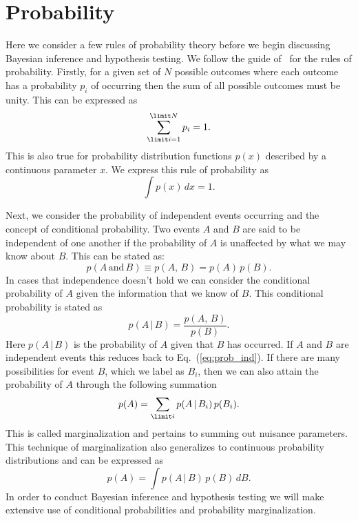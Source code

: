 \section{Probability}\label{sec:probability_basics}
Here we consider a few rules of probability theory before we begin discussing Bayesian inference and hypothesis testing. We follow the guide of~\cite{wall2012practical} for the rules of probability. Firstly, for a given set of $N$ possible outcomes where each outcome has a probability $p_i$ of occurring then the sum of all possible outcomes must be unity. This can be expressed as
\begin{equation}
 \sum_{\limit i=1}^{\limit N} p_i = 1.
\end{equation}
This is also true for probability distribution functions $p(x)$ described by a continuous parameter $x$. We express this rule of probability as
\begin{equation}
 \int p(x) \, dx = 1.
\end{equation}

Next, we consider the probability of independent events occurring and the concept of conditional probability. Two events $A$ and $B$ are said to be independent of one another if the probability of $A$ is unaffected by what we may know about $B$. This can be stated as:
\begin{equation}\label{eq:prob_ind}
 p(A \, \mathrm{and} \, B) \equiv p(A, \, B) = p(A) \, p(B).
\end{equation}
In cases that independence doesn't hold we can consider the conditional probability of $A$ given the information that we know of $B$. This conditional probability is stated as
\begin{equation}
   p(A \, | \, B) = \frac{p(A, \, B)}{p(B)}.
\end{equation}
Here $p(A \, | \, B)$ is the probability of $A$ given that $B$ has occurred. If $A$ and $B$ are independent events this reduces back to Eq.~(\ref{eq:prob_ind}). If there are many possibilities for event $B$, which we label as $B_i$, then we can also attain the probability of $A$ through the following summation
\begin{equation}\label{eq:prob_marginalization}
   p(A) = \sum_{\limit i} p(A \, | \, B_i) \, p(B_i).
\end{equation}
This is called marginalization and pertains to summing out nuisance parameters. This technique of marginalization also generalizes to continuous probability distributions and can be expressed as
\begin{equation}
   p(A) = \int p(A \, | \, B) \, p(B) \, dB.
\end{equation}
In order to conduct Bayesian inference and hypothesis testing we will make extensive use of conditional probabilities and probability marginalization.

